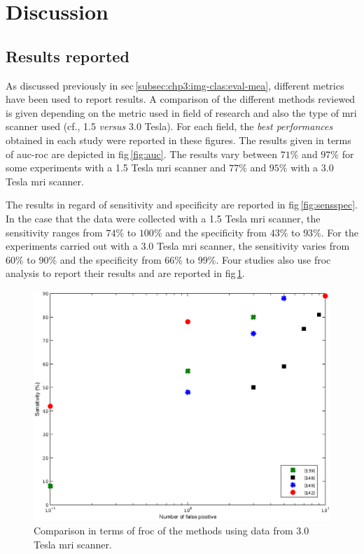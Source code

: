 \section{Discussion}\label{sec:chp3:dis}


\subsection{Results reported}\label{subsec:chp3:dis:res}

As discussed previously in \ac{sec}\,\ref{subsec:chp3:img-clas:eval-mea}, different metrics have been used to report results.
A comparison of the different methods reviewed is given depending on the metric used in field of research and also the type of \ac{mri} scanner used (cf., 1.5 \textit{versus} 3.0 Tesla).
For each field, the \textit{best performances} obtained in each study were reported in these figures.
The results given in terms of \ac{auc}-\ac{roc} are depicted in \ac{fig}\,\ref{fig:auc}.
The results vary between $71\%$ and $97\%$ for some experiments with a 1.5 Tesla \ac{mri} scanner and $77\%$ and $95\%$ with a 3.0 Tesla \ac{mri} scanner. 

The results in regard of sensitivity and specificity are reported in \ac{fig}\,\ref{fig:sensspec}.
In the case that the data were collected with a 1.5 Tesla \ac{mri} scanner, the sensitivity ranges from $74\%$ to $100\%$ and the specificity from $43\%$ to $93\%$.
For the experiments carried out with a 3.0 Tesla \ac{mri} scanner, the sensitivity varies from $60\%$ to $90\%$ and the specificity from $66\%$ to $99\%$.
Four studies also use \ac{froc} analysis to report their results and are reported in \ac{fig}\,\ref{fig:froc}.

\begin{figure}
  \centering
  \includegraphics[width=.5\linewidth]{3_review/figures/results/froc.eps}
  \caption{Comparison in terms of \ac{froc} of the methods using data from 3.0 Tesla \ac{mri} scanner.}
  \label{fig:froc}
\end{figure}

